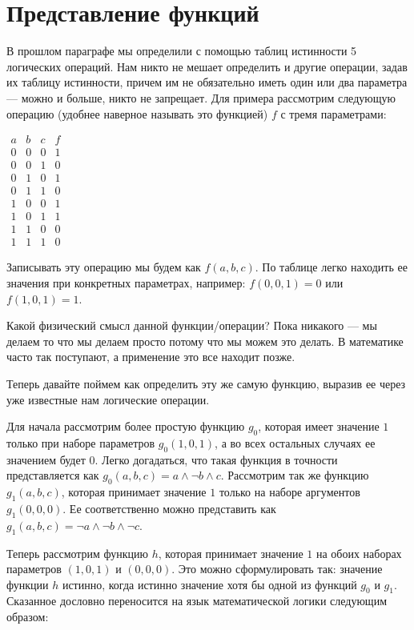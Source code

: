 \section{Представление функций}

В прошлом параграфе мы определили с помощью таблиц истинности 5 логических операций. Нам никто не мешает определить и другие операции, задав их таблицу истинности, причем им не обязательно иметь один или два параметра — можно и больше, никто не запрещает. Для примера рассмотрим следующую операцию (удобнее наверное называть это функцией) $f$ с тремя параметрами:

$\begin{array}{ccc|c}a&b&c&f\\ \hline 0&0&0&1\\0&0&1&0\\0&1&0&1\\0&1&1&0\\1&0&0&1\\1&0&1&1\\1&1&0&0\\1&1&1&0\end{array}$

Записывать эту операцию мы будем как $f(a, b, c)$. По таблице легко находить ее значения при конкретных параметрах, например: $f(0,0,1) = 0$ или $f(1,0,1) = 1$.

Какой физический смысл данной функции/операции? Пока никакого — мы делаем то что мы делаем просто потому что мы можем это делать. В математике часто так поступают, а применение это все находит позже.

Теперь давайте поймем как определить эту же самую функцию, выразив ее через уже известные нам логические операции.

Для начала рассмотрим более простую функцию $g_0$, которая имеет значение $1$ только при наборе параметров $g_0(1, 0, 1)$, а во всех остальных случаях ее значением будет $0$. Легко догадаться, что такая функция в точности представляется как $g_0(a, b, c) = a\wedge \neg b \wedge c$. Рассмотрим так же функцию $g_1(a, b, c)$, которая принимает значение $1$ только на наборе аргументов $g_1(0, 0, 0)$. Ее соответственно можно представить как $g_1(a, b, c) = \neg a \wedge \neg b \wedge \neg c$.

Теперь рассмотрим функцию $h$, которая принимает значение $1$ на обоих наборах параметров $(1, 0, 1)$ и $(0, 0, 0)$. Это можно сформулировать так:   значение функции $h$ истинно, когда истинно значение хотя бы одной из функций $g_0$ и $g_1$. Сказанное дословно переносится на язык математической логики следующим образом:

